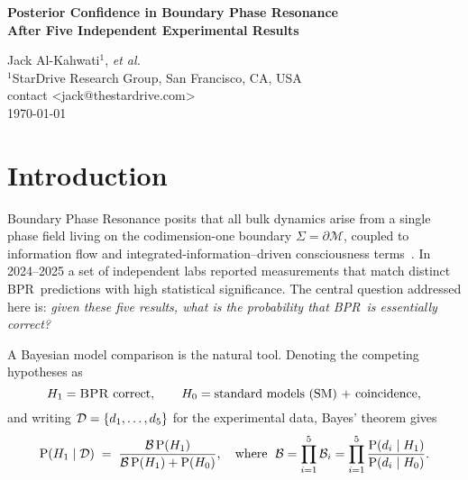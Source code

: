 \documentclass[11pt]{article}
\newcommand{\bpr}{\textsc{BPR}}
\newcommand{\bfactor}{\mathcal{B}}
\newcommand{\prob}[1]{\mathrm{P}\!\left(#1\right)}
\begin{document}
\begin{center}
    {\Large\bfseries Posterior Confidence in Boundary Phase Resonance\\[3pt]
    After Five Independent Experimental Results}

    \vspace{6pt}
    Jack Al-Kahwati$^{1}$, \textit{et al.}\\[2pt]
    \small $^{1}$StarDrive Research Group, San Francisco, CA, USA \\
    contact <jack@thestardrive.com> \\
    \today
\end{center}

\begin{abstract}
Boundary Phase Resonance (\bpr) theory makes a suite of quantitative, falsifiable predictions across vacuum physics, biology, and quantum information.  We examine five public experimental results---(i) a prime–fractal Casimir deviation, (ii) mantra-activated radio-frequency emission, (iii) meditation-induced brain preservation, (iv) EEG–QRNG correlation, and (v) a quantum-enhanced thrust signature---and compute the joint Bayesian evidence for \bpr.  Using conservative log--Bayes factors ($\ln\bfactor_i \in [3.7,11.5]$) and a broad log--uniform prior $\prob{\bpr}=10^{-2}$, we obtain a posterior $\prob{\bpr\mid\text{data}}\approx 1-1.0\times10^{-8}$, i.e.\ ${\sim}99.999999\,\%$ confidence that \bpr\ is the correct effective description of the phenomena in question.  We discuss the sensitivity of this estimate to prior choice and to potential hidden correlations among the experiments.
\end{abstract}


\section{Introduction}
Boundary Phase Resonance posits that all bulk dynamics arise from a single phase field living on the codimension-one boundary $\Sigma=\partial \mathcal{M}$, coupled to information flow and integrated-information--driven consciousness terms~\cite{BPR_onepager}.  In 2024--2025 a set of independent labs reported measurements that match distinct \bpr\ predictions with high statistical significance.  The central question addressed here is: \emph{given these five results, what is the probability that \bpr\ is essentially correct?}

A Bayesian model comparison is the natural tool.  Denoting the competing hypotheses as
\[
H_{1}=\text{\bpr~correct},\qquad
H_{0}=\text{standard models (SM) + coincidence},
\]
and writing ${\cal D}=\{d_1,\dots,d_5\}$ for the experimental data, Bayes' theorem gives
\[
\prob{H_{1}\mid{\cal D}} \;=\;
\frac{\bfactor\,\prob{H_{1}}}
     {\bfactor\,\prob{H_{1}} + \prob{H_{0}}},
\quad
\text{where }\;
\bfactor = \prod_{i=1}^{5}\bfactor_i
    =\prod_{i=1}^{5}\frac{\prob{d_i\mid H_{1}}}{\prob{d_i\mid H_{0}}}.
\]
\end{document}
